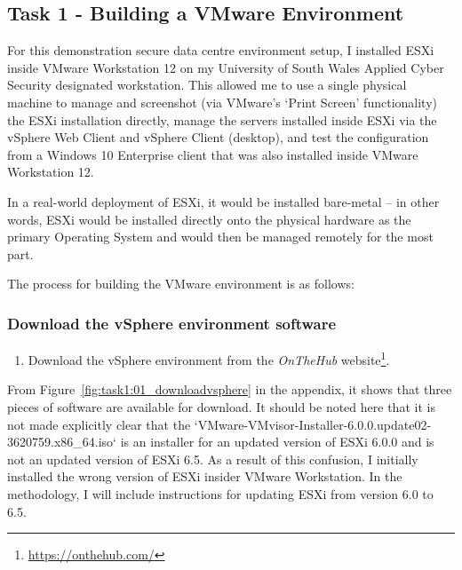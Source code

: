 \pagebreak
\subsection{Task 1 - Building a VMware Environment}
For this demonstration secure data centre environment setup, I installed ESXi inside VMware Workstation 12 on my University of South Wales Applied Cyber Security designated workstation. This allowed me to use a single physical machine to manage and screenshot (via VMware's `Print Screen' functionality) the ESXi installation directly, manage the servers installed inside ESXi via the vSphere Web Client and vSphere Client (desktop), and test the configuration from a Windows 10 Enterprise client that was also installed inside VMware Workstation 12.

In a real-world deployment of ESXi, it would be installed bare-metal -- in other words, ESXi would be installed directly onto the physical hardware as the primary Operating System and would then be managed remotely for the most part.

\bigskip
\noindent The process for building the VMware environment is as follows:

\subsubsection*{Download the vSphere environment software}
\begin{enumerate}[series=task1methodology]
  \item Download the vSphere environment from the \textit{OnTheHub\textsuperscript{\textregistered}} website\footnote{\url{https://onthehub.com/}}.
\end{enumerate}

\noindent From Figure~\ref{fig:task1:01_downloadvsphere} in the  appendix, it shows that three pieces of software are available for download. It should be noted here that it is not made explicitly clear that the `VMware-VMvisor-Installer-6.0.0.update02-3620759.x86\_64.iso` is an installer for an updated version of ESXi 6.0.0 and is not an updated version of ESXi 6.5. As a result of this confusion, I initially installed the wrong version of ESXi insider VMware Workstation. In the methodology, I will include instructions for updating ESXi from version 6.0 to 6.5.

